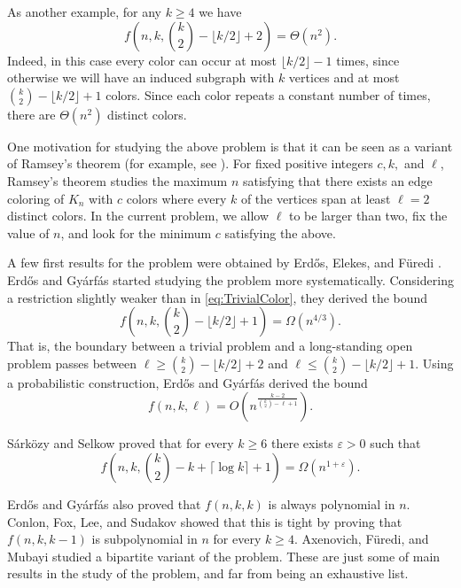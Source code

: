 \documentclass[11pt]{article}
\def\eps{{\varepsilon}}
\begin{document}
As another example, for any $k\ge 4$ we have
%
\begin{equation} \label{eq:TrivialColor}
f\left(n,k,\binom{k}{2}-\lfloor k/2 \rfloor +2 \right) = \Theta\left(n^2\right).
\end{equation}
%
Indeed, in this case every color can occur at most $\lfloor k/2 \rfloor -1$ times, since otherwise we will have an induced subgraph with $k$ vertices and at most $\binom{k}{2}-\lfloor k/2 \rfloor +1$ colors.
Since each color repeats a constant number of times, there are $\Theta\left(n^2\right)$ distinct colors.

One motivation for studying the above problem is that it can be seen as a variant of Ramsey's theorem (for example, see \cite[Chapter 27]{Jukna11}).
For fixed positive integers $c,k,$ and $\ell$, Ramsey's theorem studies the maximum $n$ satisfying that there exists an edge coloring of $K_n$ with $c$ colors where every $k$ of the vertices span at least $\ell=2$ distinct colors.
In the current problem, we allow $\ell$ to be larger than two, fix the value of $n$, and look for the minimum $c$ satisfying the above.

A few first results for the problem were obtained by Erd\H os, Elekes, and F\"uredi \cite[Section 9]{Erdos81}.
Erd\H os and Gy\'arf\'as \cite{EG97} started studying the problem more systematically.
Considering a restriction slightly weaker than in \eqref{eq:TrivialColor}, they derived the bound
%
\begin{equation}\label{eq:OneFromTriv}
 f\left(n,k,\binom{k}{2}-\lfloor k/2 \rfloor +1\right) = \Omega\left(n^{4/3}\right). 
\end{equation}
%
That is, the boundary between a trivial problem and a long-standing open problem passes between $\ell \ge \binom{k}{2}-\lfloor k/2 \rfloor +2$ and $\ell \le \binom{k}{2}-\lfloor k/2 \rfloor +1$.
Using a probabilistic construction, Erd\H os and Gy\'arf\'as \cite{EG97} derived the bound
\begin{equation} \label{eq:ProbLower}
f\left(n,k,\ell\right) = O\left(n^{\frac{k-2}{\binom{k}{2}-\ell+1}}\right).
\end{equation}

S\'ark\"ozy and Selkow \cite{SS01} proved that for every $k\ge 6$ there exists $\eps>0$ such that
%
\[ f\left(n,k,\binom{k}{2}-k +\lceil \log k\rceil +1\right) = \Omega\left(n^{1+\eps}\right). \]

Erd\H os and Gy\'arf\'as also proved that $f\left(n,k,k\right)$ is always polynomial in $n$.
Conlon, Fox, Lee, and Sudakov \cite{CFLS14} showed that this is tight by proving that $f\left(n,k,k-1\right)$ is subpolynomial in $n$ for every $k\ge 4$.
Axenovich, F\"uredi, and Mubayi \cite{AFM00} studied a bipartite variant of the problem.
These are just some of main results in the study of the problem, and far from being an exhaustive list.
\end{document}
